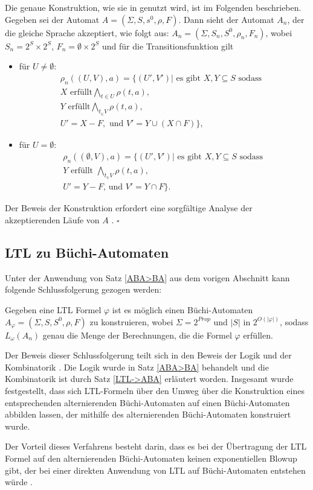 Die genaue Konstruktion, wie sie in \cite{vardi+96} genutzt wird, ist im Folgenden beschrieben. Gegeben sei der Automat $A=(\Sigma,S, s^0, \rho, F)$. Dann sieht der Automat $A_n$, der die gleiche Sprache akzeptiert, wie folgt aus: $A_n=(\Sigma,S_n,S^0,\rho_n,F_n)$, wobei $S_n=2^S\times2^S$, $F_n={\emptyset}\times2^S$ und für die Transitionsfunktion gilt \begin{itemize}
\item für $U\neq\emptyset$:
\begin{align*}
\rho_n((U,V),a)=\{(U',V')| \text{ es gibt } X,Y\subseteq S\text{ sodass}&\\
X \text{ erfüllt} \bigwedge_{t \in U}\rho(t,a),\\
Y \text{ erfüllt} \bigwedge_{t_\in V}\rho(t,a),\\
U'=X-F, \text{ und } V'=Y\cup(X\cap F)\},
\end{align*}
\item für $U=\emptyset$:
\begin{align*}
\rho_n((\emptyset,V),a)=\{(U',V')|\text{ es gibt } X,Y\subseteq S \text{ sodass }\\
Y \text{ erfüllt } \bigwedge_{t_\in V}\rho(t,a),\\
U'=Y-F\text{, und } V'=Y\cap F\}.
\end{align*}
\end{itemize}
Der Beweis der Konstruktion erfordert eine sorgfältige Analyse der akzeptierenden Läufe von $A$ \cite{vardi+96}.
$\square$



\subsection{LTL zu Büchi-Automaten}

Unter der Anwendung von Satz \ref{ABA>BA} aus dem vorigen Abschnitt kann folgende Schlussfolgerung gezogen werden:

\begin{korol}\cite{vardi+96,vardi+94}
Gegeben eine LTL Formel $\varphi$ ist es möglich einen Büchi-Automaten $A_{\varphi}=(\Sigma,S, S^0,\rho,F)$ zu konstruieren, wobei $\Sigma=2^{Prop}$ und $|S|$ in $2^{O(|\varphi|)}$, sodass $L_{\omega}(A_n)$ genau die Menge der Berechnungen, die die Formel $\varphi$ erfüllen.
\end{korol}

Der Beweis dieser Schlussfolgerung teilt sich in den Beweis der Logik und der Kombinatorik \cite{vardi+96}. Die Logik wurde in Satz \ref{ABA>BA} behandelt und die Kombinatorik ist durch Satz \ref{LTL->ABA} erläutert worden. Insgesamt wurde festgestellt, dass sich LTL-Formeln über den Umweg über die Konstruktion eines entsprechenden alternierenden Büchi-Automaten auf einen Büchi-Automaten abbilden lassen, der mithilfe des alternierenden Büchi-Automaten konstruiert wurde.

Der Vorteil dieses Verfahrens besteht darin, dass es bei der Übertragung der LTL Formel auf den alternierenden Büchi-Automaten keinen exponentiellen Blowup gibt, der bei einer direkten Anwendung von LTL auf Büchi-Automaten entstehen würde \cite{vardi+96}.